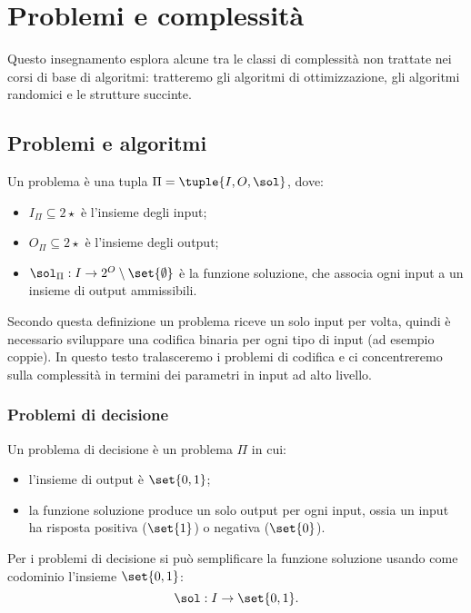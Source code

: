 \chapter{Problemi e complessità}
Questo insegnamento esplora alcune tra le classi di complessità non trattate nei corsi di base di algoritmi: tratteremo gli algoritmi di ottimizzazione, gli algoritmi randomici e le strutture succinte.



\section{Problemi e algoritmi}
\begin{defin}[problema]
	Un problema è una tupla $\Pi=\tuple{I,O,\sol}$, dove:
	\begin{itemize}
		\item $I_\Pi\subseteq 2\star$ è l'insieme degli input;
		\item $O_\Pi\subseteq 2\star$ è l'insieme degli output;
		\item $\sol_\Pi:I\to 2^O\setminus\set{\emptyset}$ è la funzione soluzione, che associa ogni input a un insieme di output ammissibili.
	\end{itemize}
\end{defin}

Secondo questa definizione un problema riceve un solo input per volta, quindi è necessario sviluppare una codifica binaria per ogni tipo di input (ad esempio coppie). In questo testo tralasceremo i problemi di codifica e ci concentreremo sulla complessità in termini dei parametri in input ad alto livello.


\subsection{Problemi di decisione}
\begin{defin}
	Un problema di decisione è un problema $\Pi$ in cui:
	\begin{itemize}
		\item l'insieme di output è $\set{0,1}$;
		\item la funzione soluzione produce un solo output per ogni input, ossia un input ha risposta positiva ($\set{1}$) o negativa ($\set{0}$).
	\end{itemize}
\end{defin}
Per i problemi di decisione si può semplificare la funzione soluzione usando come codominio l'insieme $\set{0,1}$:
\begin{equation*}
	\sol:I\to\set{0,1}\text.
\end{equation*}


